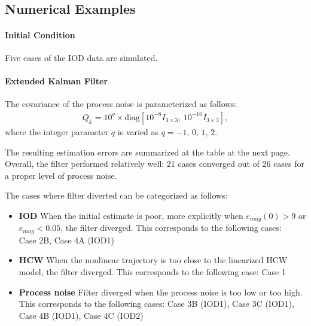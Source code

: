 \documentclass[10pt]{article}
\date{}
\begin{document}
\thispagestyle{empty}

\vspace*{0.1cm}\\
\vspace*{0.1cm}\\
\\
\\




\subsection{Numerical Examples}

\paragraph{Initial Condition}

Five cases of the IOD data are simulated. 

\paragraph{Extended Kalman Filter}

The covariance of the process noise is parameterized as follows:
\begin{align*}
Q_k = 10^{q}\times  \mathrm{diag}[10^{-8}I_{3\times 3}, \,10^{-10}I_{3\times 3}],
\end{align*}
where the integer parameter $q$ is varied as $q=-1,\,0,\,1,\,2$.

The resulting estimation errors are summarized at the table at the next page. Overall, the filter performed relatively well: 21 cases converged out of 26 cases for a proper level of process noise.

The cases where filter diverted can be categorized as follows:
\begin{itemize}
\item \textbf{IOD} When the initial estimate is poor, more explicitly when $e_{mag}(0)>9$ or $e_{mag}<0.05$, the filter diverged. This corresponds to the following cases:\\
Case 2B, Case 4A (IOD1)
\item \textbf{HCW} When the nonlinear trajectory is too close to the linearized HCW model, the filter diverged. This corresponds to the following case:
Case 1
\item \textbf{Process noise} Filter diverged when the process noise is too low or too high. This corresponds to the following cases:
Case 3B (IOD1), Case 3C (IOD1), Case 4B (IOD1), Case 4C (IOD2)
\end{itemize}
\end{document}
